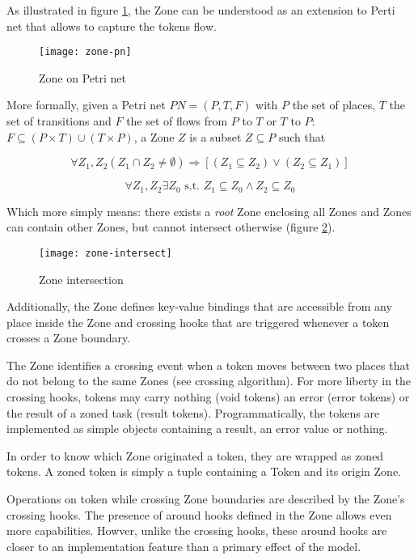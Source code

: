 As illustrated in figure \ref{fig:zpn}, the Zone can be understood as an extension to Perti net that allows to capture the tokens flow.

\begin{figure}
  \centering
  \texttt{[image: zone-pn]}
  \caption{Zone on Petri net}
  \label{fig:zpn}
\end{figure}

More formally, given a Petri net $PN = (P, T, F)$ with $P$ the set of places, $T$ the set of transitions and $F$ the set of flows from $P$ to $T$ or $T$ to $P$: $F \subseteq (P \times T) \cup (T \times P)$, a Zone $Z$ is a subset $Z \subseteq P$ such that

$$\forall Z_1, Z_2 (Z_1 \cap Z_2 \neq \emptyset) \Rightarrow [(Z_1 \subseteq Z_2) \lor (Z_2 \subseteq Z_1)] $$

$$\forall Z_1, Z_2 \exists Z_0 \text{ s.t. } Z_1 \subseteq Z_0 \land Z_2 \subseteq Z_0 $$

Which more simply means: there exists a \emph{root} Zone enclosing all Zones and Zones can contain other Zones, but cannot intersect otherwise (figure \ref{fig:zinter}).

\begin{figure}[h]
  \centering
  \texttt{[image: zone-intersect]}
  \caption{Zone intersection}
  \label{fig:zinter}
\end{figure}

Additionally, the Zone defines key-value bindings that are accessible from any place inside the Zone and crossing hooks that are triggered whenever a token crosses a Zone boundary.

The Zone identifies a crossing event when a token moves between two places that do not belong to the same Zones (see crossing algorithm). For more liberty in the crossing hooks, tokens may carry nothing (void tokens) an error (error tokens) or the result of a zoned task (result tokens). Programmatically, the tokens are implemented as simple objects containing a result, an error value or nothing.

In order to know which Zone originated a token, they are wrapped as zoned tokens. A zoned token is simply a tuple containing a Token and its origin Zone.

Operations on token while crossing Zone boundaries are described by the Zone's crossing hooks.
The presence of around hooks defined in the Zone allows even more capabilities. Howver, unlike the crossing hooks, these around hooks are closer to an implementation feature than a primary effect of the model.

